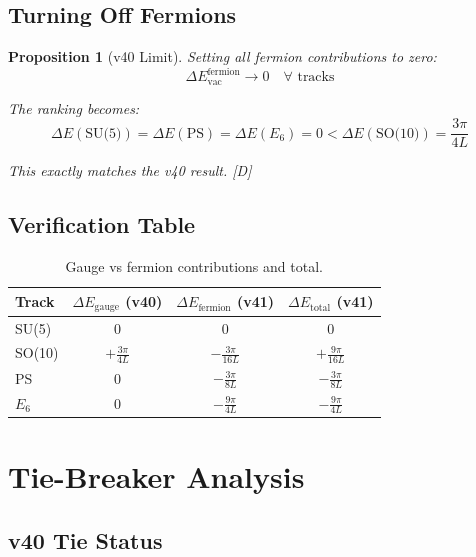 \documentclass[11pt,a4paper]{article}
\newtheorem{proposition}[theorem]{Proposition}
\newcommand{\tagD}{\textcolor{blue!70!black}{[D]}}
\begin{document}
\subsection{Turning Off Fermions}

\begin{proposition}[v40 Limit]
\label{prop:v40-limit}
Setting all fermion contributions to zero:
\begin{equation}
\label{eq:v40-limit}
\Delta E_{\text{vac}}^{\text{fermion}} \to 0 \quad \forall \text{ tracks}
\end{equation}

The ranking becomes:
\begin{equation}
\label{eq:v40-limit-rank}
\Delta E(\text{SU(5)}) = \Delta E(\text{PS}) = \Delta E(E_6) = 0 < \Delta E(\text{SO(10)}) = \frac{3\pi}{4L}
\end{equation}

This exactly matches the v40 result. \tagD
\end{proposition}

\subsection{Verification Table}

\begin{table}[h]
\centering
\begin{tabular}{lccc}
\toprule
Track & $\Delta E_{\text{gauge}}$ (v40) & $\Delta E_{\text{fermion}}$ (v41) & $\Delta E_{\text{total}}$ (v41) \\
\midrule
SU(5) & 0 & 0 & 0 \\
SO(10) & $+\frac{3\pi}{4L}$ & $-\frac{3\pi}{16L}$ & $+\frac{9\pi}{16L}$ \\
PS & 0 & $-\frac{3\pi}{8L}$ & $-\frac{3\pi}{8L}$ \\
$E_6$ & 0 & $-\frac{9\pi}{4L}$ & $-\frac{9\pi}{4L}$ \\
\bottomrule
\end{tabular}
\caption{Gauge vs fermion contributions and total.}
\label{tab:limit-check}
\end{table}

\section{Tie-Breaker Analysis}

\subsection{v40 Tie Status}
\end{document}
